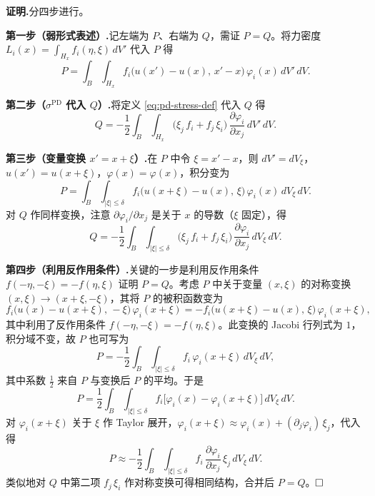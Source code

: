 \noindent\textbf{证明.}\quad 分四步进行。

\textbf{第一步（弱形式表述）.}\quad 记左端为 $P$、右端为 $Q$，需证 $P=Q$。将力密度 $L_i(x)=\int_{H_x}f_i(\eta,\xi)\,dV'$ 代入 $P$ 得
\begin{equation}
\label{eq:proof-P}
P = \int_B\int_{H_x} f_i\bigl(u(x')-u(x),\,x'-x\bigr)\,\varphi_i(x)\,dV'\,dV.
\end{equation}

\textbf{第二步（$\sigma^{\mathrm{PD}}$ 代入 $Q$）.}\quad 将定义 \eqref{eq:pd-stress-def} 代入 $Q$ 得
\begin{equation}
\label{eq:proof-Q}
Q = -\frac{1}{2}\int_B\int_{H_x}\bigl(\xi_j\,f_i + f_j\,\xi_i\bigr)\,\frac{\partial\varphi_i}{\partial x_j}\,dV'\,dV.
\end{equation}

\textbf{第三步（变量变换 $x'=x+\xi$）.}\quad 在 $P$ 中令 $\xi=x'-x$，则 $dV'=dV_\xi$，$u(x')=u(x+\xi)$，$\varphi(x)=\varphi(x)$，积分变为
\begin{equation}
\label{eq:proof-P-change}
P = \int_B\int_{|\xi|\le\delta} f_i\bigl(u(x+\xi)-u(x),\,\xi\bigr)\,\varphi_i(x)\,dV_\xi\,dV.
\end{equation}
对 $Q$ 作同样变换，注意 $\partial\varphi_i/\partial x_j$ 是关于 $x$ 的导数（$\xi$ 固定），得
\begin{equation}
\label{eq:proof-Q-change}
Q = -\frac{1}{2}\int_B\int_{|\xi|\le\delta}\bigl(\xi_j\,f_i + f_j\,\xi_i\bigr)\,\frac{\partial\varphi_i}{\partial x_j}\,dV_\xi\,dV.
\end{equation}

\textbf{第四步（利用反作用条件）.}\quad 关键的一步是利用反作用条件 $f(-\eta,-\xi)=-f(\eta,\xi)$ 证明 $P=Q$。考虑 $P$ 中关于变量 $(x,\xi)$ 的对称变换 $(x,\xi)\to(x+\xi,-\xi)$，其将 $P$ 的被积函数变为
\begin{equation}
\label{eq:proof-symmetry}
f_i\bigl(u(x)-u(x+\xi),\,-\xi\bigr)\,\varphi_i(x+\xi) = -f_i\bigl(u(x+\xi)-u(x),\,\xi\bigr)\,\varphi_i(x+\xi),
\end{equation}
其中利用了反作用条件 $f(-\eta,-\xi)=-f(\eta,\xi)$。此变换的 Jacobi 行列式为 $1$，积分域不变，故 $P$ 也可写为
\begin{equation}
\label{eq:proof-P-sym}
P = -\frac{1}{2}\int_B\int_{|\xi|\le\delta} f_i\,\varphi_i(x+\xi)\,dV_\xi\,dV,
\end{equation}
其中系数 $\tfrac{1}{2}$ 来自 $P$ 与变换后 $P$ 的平均。于是
\begin{equation}
\label{eq:proof-P-average}
P = \frac{1}{2}\int_B\int_{|\xi|\le\delta} f_i\bigl[\varphi_i(x)-\varphi_i(x+\xi)\bigr]\,dV_\xi\,dV.
\end{equation}
对 $\varphi_i(x+\xi)$ 关于 $\xi$ 作 Taylor 展开，$\varphi_i(x+\xi)\approx\varphi_i(x)+(\partial_j\varphi_i)\,\xi_j$，代入得
\begin{equation}
\label{eq:proof-P-final}
P \approx -\frac{1}{2}\int_B\int_{|\xi|\le\delta} f_i\,\frac{\partial\varphi_i}{\partial x_j}\,\xi_j\,dV_\xi\,dV.
\end{equation}
类似地对 $Q$ 中第二项 $f_j\,\xi_i$ 作对称变换可得相同结构，合并后 $P=Q$。$\hfill\square$

